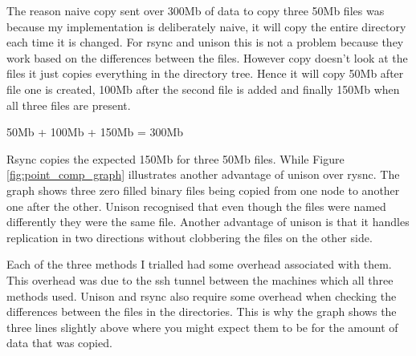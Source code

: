 \documentclass[12pt]{article}
\begin{document}
The reason naive copy sent over 300Mb of data to copy three 50Mb
files was because my implementation is deliberately naive, it will
copy the entire directory each time it is changed. For rsync and
unison this is not a problem because they work based on the
differences between the files. However copy doesn't look at
the files it just copies everything in the directory tree.
Hence it will copy 50Mb after file one is created, 100Mb after
the second file is added and finally 150Mb when all three
files are present.

50Mb + 100Mb + 150Mb = 300Mb

Rsync copies the expected 150Mb for three 50Mb files. While
Figure \ref{fig:point_comp_graph} illustrates another advantage
of unison over rysnc. The graph shows three zero filled
binary files being copied from one node to another one after
the other. Unison recognised that even though the files were named
differently they were the same file. Another advantage of unison
is that it handles replication in two directions without
clobbering the files on the other side.

Each of the three methods I trialled had some overhead associated
with them. This overhead was due to the ssh tunnel between the
machines which all three methods used. Unison and rsync also
require some overhead when checking the differences between the files
in the directories. This is why the graph shows the three lines
slightly above where you might expect them to be for the amount
of data that was copied.
\end{document}
